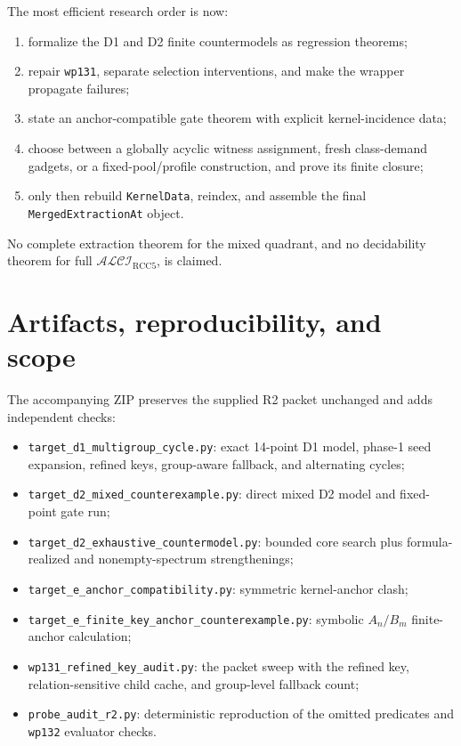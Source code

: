 \documentclass[11pt]{article}
\begin{document}
The most efficient research order is now:

\begin{enumerate}
  \item formalize the D1 and D2 finite countermodels as regression theorems;
  \item repair \texttt{wp131}, separate selection interventions, and make the wrapper
        propagate failures;
  \item state an anchor-compatible gate theorem with explicit kernel-incidence data;
  \item choose between a globally acyclic witness assignment, fresh class-demand
        gadgets, or a fixed-pool/profile construction, and prove its finite closure;
  \item only then rebuild \texttt{KernelData}, reindex, and assemble the final
        \texttt{MergedExtractionAt} object.
\end{enumerate}

No complete extraction theorem for the mixed quadrant, and no decidability theorem for
full $\mathcal{ALCI}_{\mathrm{RCC5}}$, is claimed.

\appendix
\begingroup
\small
{}
\section{Artifacts, reproducibility, and scope}

The accompanying ZIP preserves the supplied R2 packet unchanged and adds independent
checks:

\begin{itemize}
  \item \texttt{target\_d1\_multigroup\_cycle.py}: exact 14-point D1 model, phase-1
        seed expansion, refined keys, group-aware fallback, and alternating cycles;
  \item \texttt{target\_d2\_mixed\_counterexample.py}: direct mixed D2 model and
        fixed-point gate run;
  \item {\footnotesize\texttt{target\_d2\_exhaustive\_countermodel.py}}: bounded core search plus
        formula-realized and nonempty-spectrum strengthenings;
  \item \texttt{target\_e\_anchor\_compatibility.py}: symmetric kernel-anchor clash;
  \item \texttt{target\_e\_finite\_key\_anchor\_counterexample.py}: symbolic
        $A_n/B_m$ finite-anchor calculation;
  \item \texttt{wp131\_refined\_key\_audit.py}: the packet sweep with the refined key,
        relation-sensitive child cache, and group-level fallback count;
  \item \texttt{probe\_audit\_r2.py}: deterministic reproduction of the omitted
        predicates and \texttt{wp132} evaluator checks.
\end{itemize}
\end{document}
